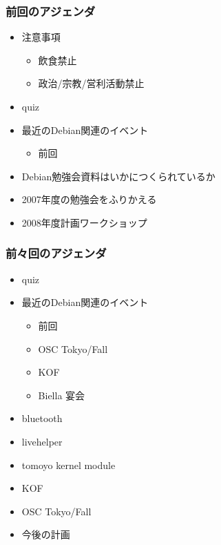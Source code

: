 \documentclass[cjk,dvipdfmx,12pt]{beamer}
\begin{document}
\begin{frame}
 \frametitle{前回のアジェンダ}
\begin{minipage}[t]{0.45\hsize}
  \begin{itemize}
  \item 注意事項
	\begin{itemize}
	 \item 飲食禁止
	 \item 政治/宗教/営利活動禁止
	\end{itemize}
  \item quiz
  \item 最近のDebian関連のイベント
	\begin{itemize}
	 \item 前回
	\end{itemize}
 \end{itemize}
\end{minipage} 
\begin{minipage}[t]{0.45\hsize}
 \begin{itemize}
  \item Debian勉強会資料はいかにつくられているか
  \item 2007年度の勉強会をふりかえる
  \item 2008年度計画ワークショップ
 \end{itemize}
\end{minipage}
\end{frame}

\begin{frame}
 \frametitle{前々回のアジェンダ}
\begin{minipage}[t]{0.45\hsize}
  \begin{itemize}
  \item quiz
  \item 最近のDebian関連のイベント
	\begin{itemize}
	 \item 前回
	 \item OSC Tokyo/Fall
	 \item KOF
	 \item Biella 宴会
	\end{itemize}
 \end{itemize}
\end{minipage} 
\begin{minipage}[t]{0.45\hsize}
 \begin{itemize}
  \item bluetooth
  \item livehelper
  \item tomoyo kernel module
  \item KOF
  \item OSC Tokyo/Fall
  \item 今後の計画
 \end{itemize}
\end{minipage}
\end{frame}
\end{document}
